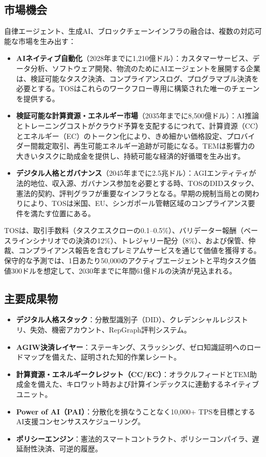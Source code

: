 \documentclass[11pt]{article}
\begin{document}
\subsection{市場機会}
自律エージェント、生成AI、ブロックチェーンインフラの融合は、複数の対応可能な市場を生み出す：
\begin{itemize}[noitemsep]
  \item \textbf{AIネイティブ自動化}（2028年までに1,210億ドル）：カスタマーサービス、データ分析、ソフトウェア開発、物流のためにAIエージェントを展開する企業は、検証可能なタスク決済、コンプライアンスログ、プログラマブル決済を必要とする。TOSはこれらのワークフロー専用に構築された唯一のチェーンを提供する。
  \item \textbf{検証可能な計算資源・エネルギー市場}（2035年までに8,500億ドル）：AI推論とトレーニングコストがクラウド予算を支配するにつれて、計算資源（CC）とエネルギー（EC）のトークン化により、きめ細かい価格設定、プロバイダー間裁定取引、再生可能エネルギー追跡が可能になる。TEMは影響力の大きいタスクに助成金を提供し、持続可能な経済的好循環を生み出す。
  \item \textbf{デジタル人格とガバナンス}（2045年までに2.5兆ドル）：AGIエンティティが法的地位、収入源、ガバナンス参加を必要とする時、TOSのDIDスタック、憲法的契約、評判グラフが重要なインフラとなる。早期の規制当局との関わりにより、TOSは米国、EU、シンガポール管轄区域のコンプライアンス要件を満たす位置にある。
\end{itemize}

TOSは、取引手数料（タスクエスクローの0.1--0.5\%）、バリデーター報酬（ベースラインシナリオでの決済の12\%）、トレジャリー配分（8\%）、および保管、仲裁、コンプライアンス報告を含むプレミアムサービスを通じて価値を獲得する。保守的な予測では、1日あたり50,000のアクティブエージェントと平均タスク価値300ドルを想定して、2030年までに年間61億ドルの決済が見込まれる。

\subsection{主要成果物}
\begin{itemize}[noitemsep]
  \item \textbf{デジタル人格スタック}：分散型識別子（DID）、クレデンシャルレジストリ、失効、機密アカウント、RepGraph評判システム。
  \item \textbf{AGIW決済レイヤー}：ステーキング、スラッシング、ゼロ知識証明へのロードマップを備えた、証明された知的作業レシート。
  \item \textbf{計算資源・エネルギークレジット（CC/EC）}：オラクルフィードとTEM助成金を備えた、キロワット時および計算インデックスに連動するネイティブユニット。
  \item \textbf{Power of AI（PAI）}：分散化を損なうことなく10,000+ TPSを目標とするAI支援コンセンサススケジューリング。
  \item \textbf{ポリシーエンジン}：憲法的スマートコントラクト、ポリシーコンパイラ、遅延耐性決済、可逆的履歴。
\end{itemize}
\end{document}

